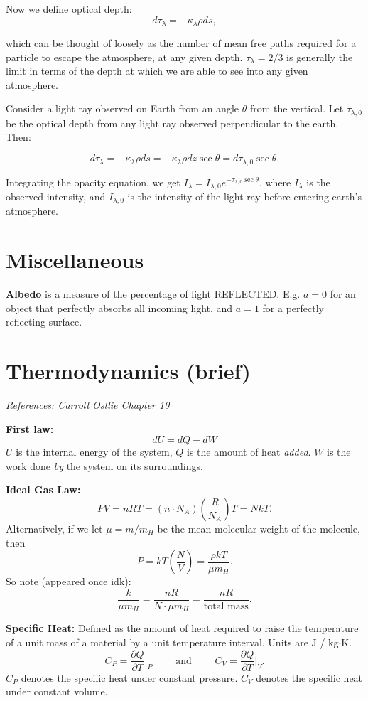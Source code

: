 \documentclass[12pt]{article}
\begin{document}
Now we define optical depth:
\[d\tau_{\lambda} = -\kappa_{\lambda}\rho ds,\]

which can be thought of loosely as the number of mean free paths required for a particle to escape the atmosphere, at any given depth. $\tau_{\lambda} = 2/3$ is generally the limit in terms of the depth at which we are able to see into any given atmosphere.

Consider a light ray observed on Earth from an angle $\theta$ from the vertical. Let $\tau_{\lambda, 0}$ be the optical depth from any light ray observed perpendicular to the earth. Then: 

\[d\tau_{\lambda} = -\kappa_{\lambda}\rho ds = -\kappa_{\lambda}\rho dz \sec{\theta} = d\tau_{\lambda, 0}\sec{\theta}.\]

Integrating the opacity equation, we get 
$I_{\lambda} = I_{\lambda,0}e^{-\tau_{\lambda, 0}\sec{\theta}}$, where $I_{\lambda}$ is the observed intensity, and $I_{\lambda,0}$ is the intensity of the light ray before entering earth's atmosphere.

\newpage
\section{Miscellaneous}

\textbf{Albedo} is a measure of the percentage of light REFLECTED. E.g. $a = 0$ for an object that perfectly absorbs all incoming light, and $a=1$ for a perfectly reflecting surface.

\newpage
\section{Thermodynamics (brief)}
\textit{References: Carroll Ostlie Chapter 10}

\textbf{First law: }
\[dU = dQ - dW\]
$U$ is the internal energy of the system, $Q$ is the amount of heat \textit{added}. $W$ is the work done \textit{by} the system on its surroundings.

\textbf{Ideal Gas Law:}
\[PV = nRT = (n\cdot N_A)\left(\frac{R}{N_A}\right)T = NkT.\]
Alternatively, if we let $\mu = m / m_H$ be the mean molecular weight of the molecule, then 
\[P = kT \left(\frac{N}{V}\right) = \frac{\rho kT}{\mu m_H}.\]
So note (appeared once idk):
\[\frac{k}{\mu m_H} = \frac{nR}{N\cdot \mu m_H} = \frac{nR}{\text{total mass}}.\]

\textbf{Specific Heat:}
Defined as the amount of heat required to raise the temperature of a unit mass of a material by a unit temperature interval. Units are J / kg$\cdot$K.
\[C_P = \frac{\partial Q}{\partial T}\Biggr|_P\qquad \text{ and }\qquad C_V = \frac{\partial Q}{\partial T}\Biggr|_V.\]
$C_P$ denotes the specific heat under constant pressure. $C_V$ denotes the specific heat under constant volume. 
\end{document}

